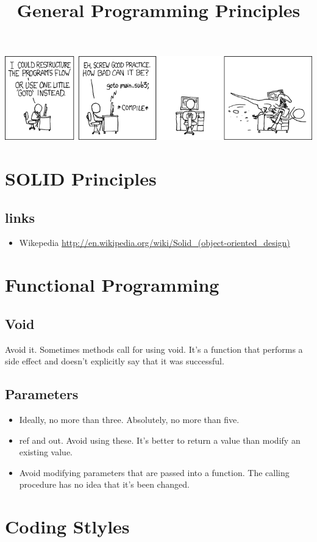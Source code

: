 \documentclass {amsart}
\title{General Programming Principles}
\begin{document}
\maketitle

\includegraphics[scale=6]{GOTO.png}


\section{SOLID Principles}
	\subsection{links}
		\begin{itemize}
			\item Wikepedia \url{http://en.wikipedia.org/wiki/Solid_(object-oriented_design)}
		\end{itemize}

\section{Functional Programming}
	\subsection{Void} Avoid it.
		Sometimes methods call for using void.  It's a function that performs a side effect and doesn't explicitly say that it was successful.	
	\subsection{Parameters}
		\begin{itemize}
			\item Ideally, no more than three.  Absolutely, no more than five.
			\item ref and out.  Avoid using these.  It's better to return a value than modify an existing value.
			\item Avoid modifying parameters that are passed into a function.  The calling procedure has no idea that it's been changed. 
		\end{itemize}
\section{Coding Stlyles}
\end{document}
